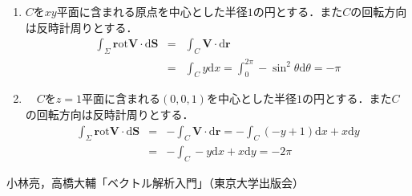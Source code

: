 \documentclass{jarticle}
\def\d{\mathrm d}
\def\rot{\mathrm{\bm rot}}
\begin{document}
\begin{enumerate}
\begin{enumerate}
      \end{enumerate}
    \item
      $C$を$xy$平面に含まれる原点を中心とした半径$1$の円とする．また$C$の回転方向は反時計周りとする．
      \begin{eqnarray*}
        \int_\Sigma \rot {\bm V} \cdot \d {\bm S} & = & \int_C {\bm V} \cdot \d {\bm r} \\
        & = & \int_C y \d x = \int_0^{2\pi} -\sin^2 \theta \d \theta =- \pi
      \end{eqnarray*}
    \item
    　$C$を$z=1$平面に含まれる$(0,0,1)$を中心とした半径$1$の円とする．また$C$の回転方向は反時計周りとする．
      \begin{eqnarray*}
        \int_\Sigma \rot {\bm V} \cdot \d {\bm S} & = & - \int_C {\bm V} \cdot \d {\bm r} = - \int_C (-y+1) \d x + x \d y \\
        & = & - \int_C -y \d x + x \d y = - 2 \pi
      \end{eqnarray*}
  \end{enumerate}
  \begin{thebibliography}{99}
 小林亮，高橋大輔「ベクトル解析入門」（東京大学出版会）
\end{thebibliography}
\end{document}
